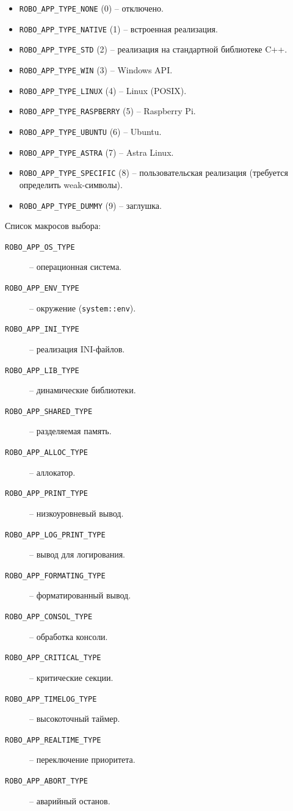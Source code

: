 \documentclass[a4paper,12pt]{article}
\begin{document}
\begin{itemize}
    \item \texttt{ROBO\_APP\_TYPE\_NONE} (0) -- отключено.
    \item \texttt{ROBO\_APP\_TYPE\_NATIVE} (1) -- встроенная реализация.
    \item \texttt{ROBO\_APP\_TYPE\_STD} (2) -- реализация на стандартной библиотеке C++.
    \item \texttt{ROBO\_APP\_TYPE\_WIN} (3) -- Windows API.
    \item \texttt{ROBO\_APP\_TYPE\_LINUX} (4) -- Linux (POSIX).
    \item \texttt{ROBO\_APP\_TYPE\_RASPBERRY} (5) -- Raspberry Pi.
    \item \texttt{ROBO\_APP\_TYPE\_UBUNTU} (6) -- Ubuntu.
    \item \texttt{ROBO\_APP\_TYPE\_ASTRA} (7) -- Astra Linux.
    \item \texttt{ROBO\_APP\_TYPE\_SPECIFIC} (8) -- пользовательская реализация (требуется определить weak-символы).
    \item \texttt{ROBO\_APP\_TYPE\_DUMMY} (9) -- заглушка.
\end{itemize}

Список макросов выбора:

\begin{description}
    \item[\texttt{ROBO\_APP\_OS\_TYPE}] -- операционная система.
    \item[\texttt{ROBO\_APP\_ENV\_TYPE}] -- окружение (\texttt{system::env}).
    \item[\texttt{ROBO\_APP\_INI\_TYPE}] -- реализация INI-файлов.
    \item[\texttt{ROBO\_APP\_LIB\_TYPE}] -- динамические библиотеки.
    \item[\texttt{ROBO\_APP\_SHARED\_TYPE}] -- разделяемая память.
    \item[\texttt{ROBO\_APP\_ALLOC\_TYPE}] -- аллокатор.
    \item[\texttt{ROBO\_APP\_PRINT\_TYPE}] -- низкоуровневый вывод.
    \item[\texttt{ROBO\_APP\_LOG\_PRINT\_TYPE}] -- вывод для логирования.
    \item[\texttt{ROBO\_APP\_FORMATING\_TYPE}] -- форматированный вывод.
    \item[\texttt{ROBO\_APP\_CONSOL\_TYPE}] -- обработка консоли.
    \item[\texttt{ROBO\_APP\_CRITICAL\_TYPE}] -- критические секции.
    \item[\texttt{ROBO\_APP\_TIMELOG\_TYPE}] -- высокоточный таймер.
    \item[\texttt{ROBO\_APP\_REALTIME\_TYPE}] -- переключение приоритета.
    \item[\texttt{ROBO\_APP\_ABORT\_TYPE}] -- аварийный останов.
\end{description}
\end{document}
